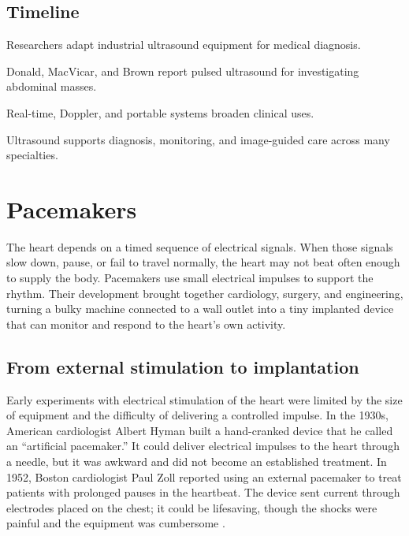 \documentclass[12pt,oneside]{book}
\begin{document}
\section*{Timeline}
\begin{description}[leftmargin=2.3cm,style=nextline]
  \item[1950s] Researchers adapt industrial ultrasound equipment for medical diagnosis.
  \item[1958] Donald, MacVicar, and Brown report pulsed ultrasound for investigating abdominal masses.
  \item[Later twentieth century] Real-time, Doppler, and portable systems broaden clinical uses.
  \item[Today] Ultrasound supports diagnosis, monitoring, and image-guided care across many specialties.
\end{description}

\chapter[Pacemakers]{Pacemakers}

The heart depends on a timed sequence of electrical signals. When those
signals slow down, pause, or fail to travel normally, the heart may not
beat often enough to supply the body. Pacemakers use small electrical
impulses to support the rhythm. Their development brought together
cardiology, surgery, and engineering, turning a bulky machine connected to
a wall outlet into a tiny implanted device that can monitor and respond to
the heart's own activity.

\section{From external stimulation to implantation}
Early experiments with electrical stimulation of the heart were limited
by the size of equipment and the difficulty of delivering a controlled
impulse. In the 1930s, American cardiologist Albert Hyman built a
hand-cranked device that he called an ``artificial pacemaker.'' It could
deliver electrical impulses to the heart through a needle, but it was
awkward and did not become an established treatment. In 1952, Boston
cardiologist Paul Zoll reported using an external pacemaker to treat
patients with prolonged pauses in the heartbeat. The device sent current
through electrodes placed on the chest; it could be lifesaving, though the
shocks were painful and the equipment was cumbersome
\cite{aquilinaPacingHistory}.
\end{document}

